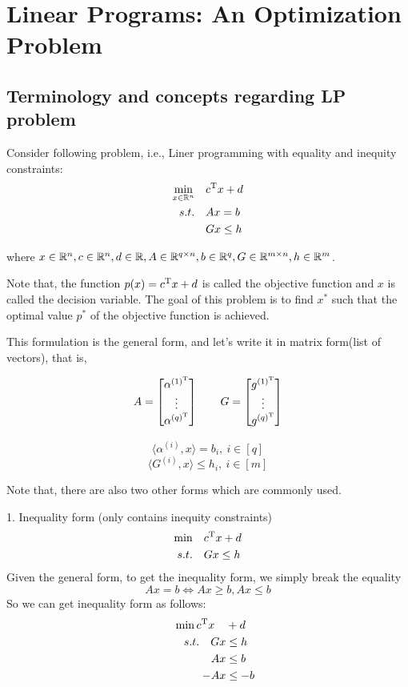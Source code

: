 
\section{Linear Programs: An Optimization Problem}
\subsection{Terminology and concepts regarding LP problem}
Consider following problem, i.e., Liner programming with equality and inequity constraints:
\begin{align*}
	\min_{x\in \mathbb{R}^n}\quad& c^{{\rm T}}x + d\\
	s.t. \quad &Ax = b\\
	&Gx \leq h
\end{align*}

where $x\in \mathbb{R}^n, c\in \mathbb{R}^n, d\in \mathbb{R}, A\in \mathbb{R}^{q\times n}, b\in \mathbb{R}^q, G\in \mathbb{R}^{m\times n}, h\in \mathbb{R}^m$.

Note that, the function $p(x)=c^{{\rm T}}x + d$ is called the objective function and $x$ is called the decision variable. The goal of this problem is to find $x^*$ such that the optimal value $p^*$ of the objective function is achieved.

This formulation is the general form, and let's write it in matrix form(list of vectors), that is,

$$
A = 
\begin{bmatrix}
\alpha^{(1)^{{\rm T}}}\\
\vdots\\
\alpha^{(q)^{{\rm T}}}
\end{bmatrix}
\qquad	
G = 
\begin{bmatrix}
g^{(1)^{{\rm T}}}\\
\vdots\\
g^{(q)^{{\rm T}}}
\end{bmatrix}
$$

$$\langle \alpha^{(i)}, x\rangle =b_i,\ i\in \left[q\right]$$
$$\langle G^{(i)}, x\rangle\leq h_i,\ i\in \left[m\right]$$

Note that, there are also two other forms which are commonly used.

1. Inequality form (only contains inequity constraints)
\begin{align*}
	\min \quad &c^{{\rm T}}x+d\\
	s.t. \quad &Gx\leq h\\
\end{align*}
Given the general form, to get the inequality form, we simply break the equality
\begin{equation*}
	Ax = b \Leftrightarrow Ax\geq b, Ax\leq b
\end{equation*}
So we can get inequality form as follows:
\begin{align*}
	\min c^{{\rm T}}x\quad&+d\\
	\qquad s.t. \quad Gx &\leq h\\
	Ax &\leq b\\
	-Ax &\leq -b
\end{align*}


